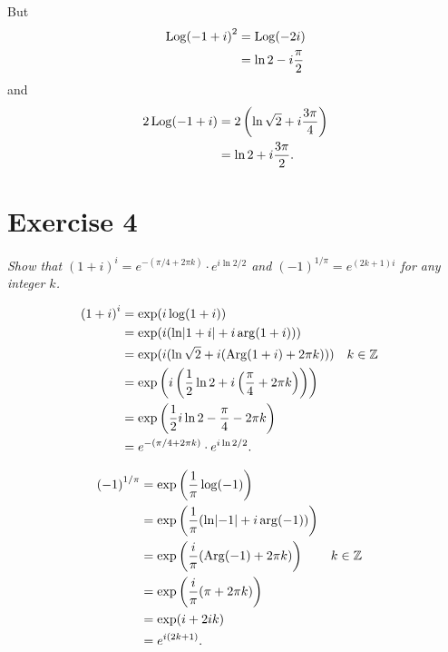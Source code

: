 \documentclass{tufte-handout}
\DeclareMathOperator{\Log}{Log}
\DeclareMathOperator{\Arg}{Arg}
\DeclarePairedDelimiter\abs{\lvert}{\rvert}%
\begin{document}
But
\begin{align*}
  \Log(-1 + i{)}^2 &= \Log(-2i)\\
                   &= \ln 2 - i {\pi \over 2}
\end{align*}
and
\begin{align*}
  2 \Log(-1 + i) &= 2 \left( \ln \sqrt 2 + i {3 \pi \over 4} \right)\\
                 &= \ln 2 + i {3 \pi \over 2}.
\end{align*}

\section{Exercise 4}

\emph{Show that ${(1 + i)}^i = e^{-(\pi/4 + 2 \pi k)} \cdot e^{i \ln 2
  / 2}$ and ${(-1)}^{1/\pi} = e^{(2k + 1)i}$ for any integer $k$.}

\bigskip

\begin{align*}
  (1 + i{)}^i &= \exp(i \log (1 + i))\\
              &= \exp(i(\ln\abs{1 + i} + i \arg(1 + i)))\\
              &= \exp(i(\ln \sqrt 2 + i(\Arg(1 + i) + 2 \pi k)))
              && k \in \mathbb{Z}\\
              &= \exp\left(i \left( {1 \over 2} \ln 2 + i \left({\pi \over
                4} + 2 \pi k \right) \right) \right)\\
              &= \exp \left( {1 \over 2} i \ln 2 - {\pi \over 4} - 2
                \pi k \right)\\
              &= e^{-(\pi/4 + 2 \pi k)} \cdot e^{i \ln 2 / 2}.
\end{align*}

\begin{align*}
  (-1{)}^{1/\pi} &= \exp \left( {1 \over \pi} \log (-1) \right)\\
                 &= \exp \left( {1 \over \pi} ( \ln \abs{-1} + i
                   \arg(-1) ) \right)\\
                 &= \exp \left( {i \over \pi}(\Arg(-1) + 2 \pi k)
                   \right)
                 && k \in \mathbb{Z}\\
                 &= \exp \left( {i \over \pi}(\pi + 2 \pi k) \right)\\
                 &= \exp(i + 2 i k)\\
                 &= e^{i(2k + 1)}.
\end{align*}
\end{document}
